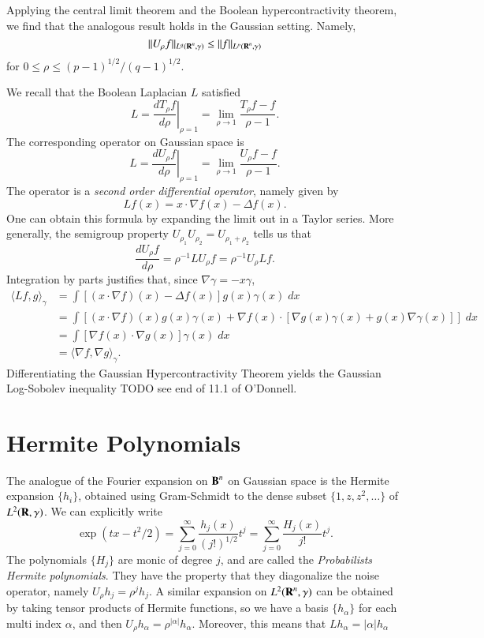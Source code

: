 Applying the central limit theorem and the Boolean hypercontractivity theorem, we find that the analogous result holds in the Gaussian setting. Namely,
%
\[ \| U_\rho f \|_{L^q(\operatorname{\mathbf{R}}^n,\gamma)} \leq \| f \|_{L^p(\operatorname{\mathbf{R}}^n,\gamma)} \]
%
for $0 \leq \rho \leq (p-1)^{1/2} / (q - 1)^{1/2}$.

We recall that the Boolean Laplacian $L$ satisfied
%
\[ L = \left. \frac{d T_\rho f}{d\rho} \right|_{\rho = 1} = \lim_{\rho \to 1} \frac{T_\rho f - f}{\rho - 1}. \]
%
The corresponding operator on Gaussian space is
%
\[ L = \left. \frac{d U_\rho f}{d\rho} \right|_{\rho = 1} = \lim_{\rho \to 1} \frac{U_\rho f - f}{\rho - 1}. \]
%
The operator is a \emph{second order differential operator}, namely given by
%
\[ Lf(x) = x \cdot \nabla f(x) - \Delta f(x). \]
%
One can obtain this formula by expanding the limit out in a Taylor series. More generally, the semigroup property $U_{\rho_1} U_{\rho_2} = U_{\rho_1 + \rho_2}$ tells us that
%
\[ \frac{dU_\rho f}{d \rho} = \rho^{-1} L U_\rho f = \rho^{-1} U_\rho L f. \]
%
Integration by parts justifies that, since $\nabla \gamma = - x \gamma$,
%
\begin{align*}
    \langle L f, g \rangle_\gamma &= \int [(x \cdot \nabla f)(x) - \Delta f(x)] g(x) \gamma(x)\; dx\\
    &= \int [(x \cdot \nabla f)(x) g(x) \gamma(x) + \nabla f(x) \cdot [\nabla g(x) \gamma(x) + g(x) \nabla \gamma(x)]]\; dx\\
    &= \int [\nabla f(x) \cdot \nabla g(x)] \gamma(x)\; dx\\
    &= \langle \nabla f, \nabla g \rangle_\gamma.
\end{align*}
%
Differentiating the Gaussian Hypercontractivity Theorem yields the Gaussian Log-Sobolev inequality TODO see end of 11.1 of O'Donnell.

\section{Hermite Polynomials}

The analogue of the Fourier expansion on $\operatorname{\mathbf{B}}^n$ on Gaussian space is the Hermite expansion $\{ h_i \}$, obtained using Gram-Schmidt to the dense subset $\{ 1, z, z^2, \dots \}$ of $L^2(\operatorname{\mathbf{R}}, \gamma)$. We can explicitly write
%
\[ \exp(tx - t^2/2) = \sum_{j = 0}^\infty \frac{h_j(x)}{(j!)^{1/2}} t^j = \sum_{j = 0}^\infty \frac{H_j(x)}{j!} t^j. \]
%
The polynomials $\{ H_j \}$ are monic of degree $j$, and are called the \emph{Probabilists Hermite polynomials}. They have the property that they diagonalize the noise operator, namely $U_\rho h_j = \rho^j h_j$. A similar expansion on $L^2(\operatorname{\mathbf{R}}^n, \gamma)$ can be obtained by taking tensor products of Hermite functions, so we have a basis $\{ h_\alpha \}$ for each multi index $\alpha$, and then $U_\rho h_\alpha = \rho^{|\alpha|} h_\alpha$. Moreover, this means that $L h_\alpha = |\alpha| h_\alpha$

